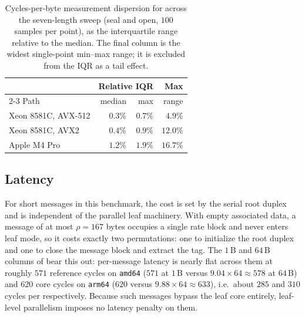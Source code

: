 \begin{table}
\centering
\caption{Cycles-per-byte measurement dispersion for \TW{} across the
seven-length sweep (seal and open, $100$ samples per point), as the
interquartile range relative to the median. The final column is the widest
single-point min--max range; it is excluded from the IQR as a tail effect.}
\label{tab:dispersion}
\begin{tabular}{l rrr}
\toprule
& \multicolumn{2}{c}{Relative IQR} & Max \\
\cmidrule(lr){2-3}
Path & median & max & range \\
\midrule
Xeon 8581C, AVX-512 & $0.3\%$ & $0.7\%$ & $\phantom{0}4.9\%$ \\
Xeon 8581C, AVX2    & $0.4\%$ & $0.9\%$ & $12.0\%$ \\
Apple M4 Pro        & $1.2\%$ & $1.9\%$ & $16.7\%$ \\
\bottomrule
\end{tabular}
\end{table}

\subsection{Latency}
\label{sec:latency}

For short messages in this benchmark, the cost is set by the serial root
duplex and is independent of the parallel leaf machinery. With empty associated
data, a message of at most $\rho = 167$ bytes occupies a single rate block and
never enters leaf mode, so it costs exactly two permutations: one to initialize
the root duplex and one to close the message block and extract the tag. The
$1$\,B and $64$\,B columns of  bear this out: per-message latency
is nearly flat across them at roughly $571$ reference cycles on \texttt{amd64}
($571$ at $1$\,B versus $9.04 \times 64 \approx 578$ at $64$\,B) and $620$
core cycles on \texttt{arm64} ($620$ versus $9.88 \times 64 \approx 633$),
i.e.\ about $285$ and $310$ cycles per \Keccakp{} respectively. Because such
messages bypass the leaf core entirely, leaf-level parallelism imposes no
latency penalty on them.

